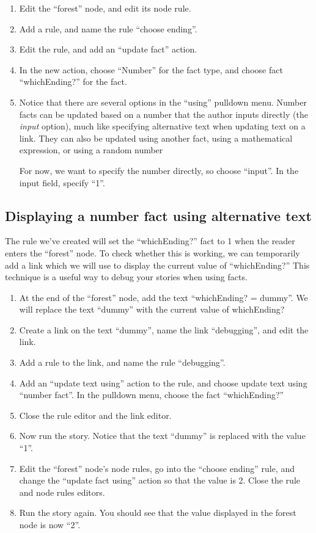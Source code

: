 \documentclass{article}
\begin{document}
\begin{enumerate}
    \item Edit the ``forest'' node, and edit its node rule.
    \item Add a rule, and name the rule ``choose ending''.
    \item Edit the rule, and add an ``update fact'' action.
    \item In the new action, choose ``Number'' for the fact type, and 
    choose fact ``whichEnding?'' for the fact.
    \item Notice that there are several options in the ``using'' 
    pulldown menu. Number facts can be updated based on a number 
    that the author inputs directly (the \textit{input} option), much 
    like specifying alternative text when updating text on a link. 
    They can also be updated using another fact, using a mathematical 
    expression, or using a random number
    
    For now, we want to specify the number directly, so choose 
    ``input''. In the input field, specify ``1''.
\end{enumerate}

\subsection{Displaying a number fact using alternative text}

The rule we've created will set the ``whichEnding?'' fact to 1 when 
the reader enters the ``forest'' node. To check whether this is 
working, we can temporarily add a link which we will use to display 
the current value of ``whichEnding?'' This technique is a useful way 
to debug your stories when using facts.

\begin{enumerate}
    \item At the end of the ``forest'' node, add the text 
    ``whichEnding? =  
    dummy''. We will replace the text ``dummy'' with the current 
    value of whichEnding?
    \item Create a link on the text ``dummy'', name the link 
    ``debugging'', and edit the link.
    \item Add a rule to the link, and name the rule ``debugging''.
    \item Add an ``update text using'' action to the rule, and choose 
    update text using ``number fact''. In the pulldown menu, choose 
    the fact ``whichEnding?''
    \item Close the rule editor and the link editor.
    \item Now run the story. Notice that the text ``dummy'' is 
    replaced with the value ``1''.
    \item Edit the ``forest'' node's node rules, go into the ``choose 
    ending'' rule, and change the ``update fact using'' action so 
    that the value is 2. Close the rule and node rules editors.
    \item Run the story again. You should see that the value 
    displayed in the forest node is now ``2''.
\end{enumerate}
\end{document}
